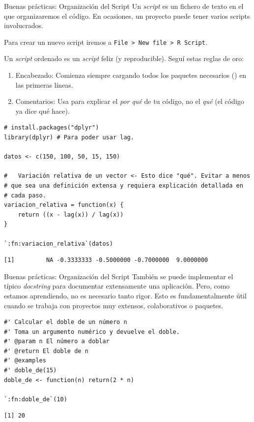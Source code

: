 \documentclass[8pt]{beamer}
\begin{document}
	\begin{frame}[fragile]{Buenas prácticas: Organización del Script}
		Un \textit{script} es un fichero de texto en el que organizaremos el código. En ocasiones, un proyecto puede tener varios scripts involucrados.
		
		Para crear un nuevo script iremos a \verb|File > New file > R Script|.
		
		Un \textit{script} ordenado es un \textit{script} feliz (y reproducible). Segu\'i estas reglas de oro:
		\begin{enumerate}
			\item Encabezado: Comienza siempre cargando todos los paquetes necesarios () en las primeras líneas.
			\item Comentarios: Usa \rscript{#} para explicar el \textit{por qué} de tu código, no el \textit{qué} (el código ya dice qué hace).
		\end{enumerate}
		
		\begin{lstlisting}[style=RScript]
# install.packages("dplyr")
library(dplyr) # Para poder usar lag.

datos <- c(150, 100, 50, 15, 150)

#   Variación relativa de un vector <- Esto dice "qué". Evitar a menos
# que sea una definición extensa y requiera explicación detallada en
# cada paso.
variacion_relativa = function(x) {
	return ((x - lag(x)) / lag(x))
}

`:fn:variacion_relativa`(datos)
\end{lstlisting}
\begin{lstlisting}[style=RConsole]
[1]         NA -0.3333333 -0.5000000 -0.7000000  9.0000000
\end{lstlisting}
	\end{frame}







\begin{frame}[fragile]{Buenas prácticas: Organización del Script}
	También se puede implementar el típico \emph{docstring} para documentar extensamente una aplicaci\'on. Pero, como estamos aprendiendo, no es necesario tanto rigor. Esto es fundamentalmente \'util cuando se trabaja con proyectos muy extensos, colaborativos o paquetes.
	
\begin{lstlisting}[style=RScript]
#' Calcular el doble de un número n
#' Toma un argumento numérico y devuelve el doble.
#' @param n El número a doblar
#' @return El doble de n
#' @examples
#' doble_de(15)
doble_de <- function(n) return(2 * n)

`:fn:doble_de`(10)
\end{lstlisting}
\begin{lstlisting}[style=RConsole]
[1] 20
\end{lstlisting}
\end{frame}
\end{document}
